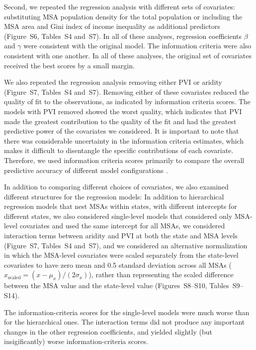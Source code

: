\documentclass[draft,linenumbers]{agujournal}
\begin{document}
Second, we repeated the regression analysis
with different sets of covariates:
substituting MSA population density
for the total population or
including the MSA area and Gini index of income inequality as additional
predictors (Figure~S6, Tables~S4 and~S7).
In all of these analyses, regression coefficients $\beta$ and $\gamma$
were consistent with the original model.
The information criteria were also consistent with one another.
In all of these analyses, the original set of covariates received the best
scores by a small
margin.

We also repeated the regression analysis removing either PVI or aridity
(Figure~S7, Tables~S4 and~S7).
Removing either of these covariates
reduced the quality of fit to the observations,
as indicated by information criteria scores.
The models with PVI removed showed the worst quality, which indicates that PVI
made the greatest contribution to the quality of the fit and had the greatest predictive power
of the covariates we considered.
It is important to note that there was considerable uncertainty in the information criteria estimates, which makes it
difficult to disentangle the specific contributions of each covariate.
Therefore, we used information criteria scores primarily to compare the overall predictive accuracy of different
model configurations \citep{gelman:predictive:2014}.

In addition to comparing different choices of covariates, we also
examined different structures for the regression models:
In addition to hierarchical regression models that nest MSAs within states,
with different intercepts for different states, we also
considered single-level models that considered only MSA-level covariates and
used the same intercept for all MSAs,
we considered interaction terms between aridity and PVI at both
the state and MSA levels (Figure~S7, Tables~S4 and~S7),
and we considered an alternative normalization
in which the MSA-level covariates were scaled separately
from the state-level covariates to have zero mean and 0.5 standard deviation
across all MSAs ($x_{\text{scaled}} = (x - \mu_x) / (2 \sigma_x)$),
rather than representing
the scaled difference between the MSA value and the state-level value
(Figures~S8--S10, Tables~S9--S14).

The information-criteria scores for the single-level models were much
worse than for the hierarchical ones.
The interaction terms did not produce any
important changes in the other regression coefficients, and yielded
slightly (but insigificantly) worse information-criteria scores.
\end{document}
